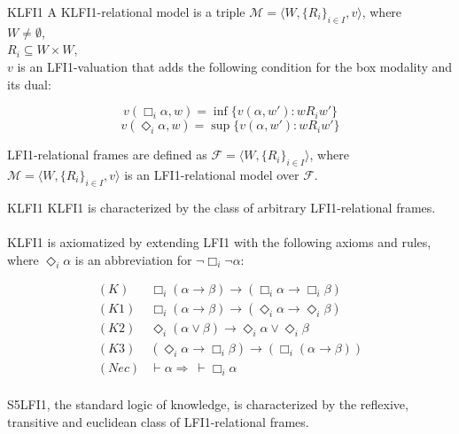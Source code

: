 \documentclass[aspectratio=169,11pt]{beamer}
\begin{document}
\begin{frame}{KLFI1}
A KLFI1-relational model is a triple $\mathcal{M} = \langle W, \{R_i\}_{i \in I}, v\rangle$, where 
\\$W \neq \emptyset$, \\$R_i \subseteq W \times W$, \\$v$ is an LFI1-valuation that adds the following condition for the box modality and its dual:

\[v(\Box_i\alpha, w) = \inf\{v(\alpha, w'): wR_iw'\}\]
\[v(\Diamond_i\alpha, w) = \sup\{v(\alpha, w'): wR_iw'\}\]

LFI1-relational frames are defined as $\mathcal{F} = \langle W, \{R_i\}_{i\in I}\rangle$, where $\mathcal{M} = \langle W, \{R_i\}_{i \in I}, v\rangle$ is an LFI1-relational model over $\mathcal{F}$.
\end{frame}

\begin{frame}{KLFI1}
    KLFI1 is characterized by the class of arbitrary LFI1-relational frames.
    \\~\\
    KLFI1 is axiomatized by extending LFI1 with the following axioms and rules, where $\Diamond_i\alpha$ is an abbreviation for $\neg\Box_i\neg\alpha$:

    \[\begin{array}{ll}
    (K) & \Box_i(\alpha \rightarrow \beta) \rightarrow (\Box_i \alpha \rightarrow \Box_i\beta) \\ 
        (K1) &  \Box_i(\alpha \rightarrow \beta) \rightarrow (\Diamond_i\alpha \rightarrow \Diamond_i \beta)\\
         (K2) & \Diamond_i(\alpha \lor \beta) \rightarrow \Diamond_i \alpha \lor \Diamond_i\beta\\
(K3) & (\Diamond_i\alpha \rightarrow \Box_i\beta) \rightarrow (\Box_i(\alpha \rightarrow \beta))\\
(Nec) & \vdash \alpha \Rightarrow\ \vdash \Box_i\alpha\\
    \end{array}\]

    S5LFI1, the standard logic of knowledge, is characterized by the reflexive, transitive and euclidean class of LFI1-relational frames.
\end{frame}
\end{document}
